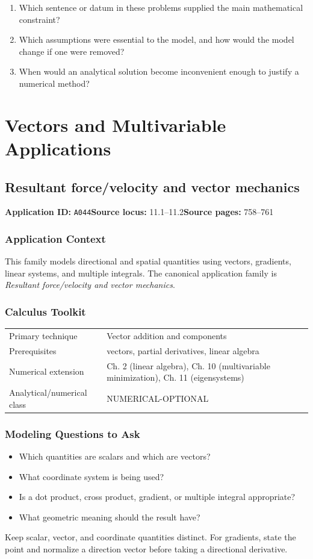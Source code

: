 \documentclass[11pt]{book}
\newcommand{\pid}[1]{\texttt{#1}}
\begin{document}
\begin{reflectionbox}\begin{enumerate}
\item Which sentence or datum in these problems supplied the main mathematical constraint?
\item Which assumptions were essential to the model, and how would the model change if one were removed?
\item When would an analytical solution become inconvenient enough to justify a numerical method?
\end{enumerate}\end{reflectionbox}
\part{Vectors and Multivariable Applications}
\chapter{Resultant force/velocity and vector mechanics}\label{app:A044}
\textbf{Application ID:} \pid{A044}\quad \textbf{Source locus:} 11.1–11.2\quad \textbf{Source pages:} 758–761
\section*{Application Context}
This family models directional and spatial quantities using vectors, gradients, linear systems, and multiple integrals. The canonical application family is \emph{Resultant force/velocity and vector mechanics}.
\section*{Calculus Toolkit}
\begin{tabularx}{\textwidth}{@{}lX@{}}\toprule
Primary technique & Vector addition and components \\
Prerequisites & vectors, partial derivatives, linear algebra \\
Numerical extension & Ch. 2 (linear algebra), Ch. 10 (multivariable minimization), Ch. 11 (eigensystems) \\
Analytical/numerical class & NUMERICAL-OPTIONAL \\
\bottomrule\end{tabularx}
\section*{Modeling Questions to Ask}\begin{itemize}
\item Which quantities are scalars and which are vectors?
\item What coordinate system is being used?
\item Is a dot product, cross product, gradient, or multiple integral appropriate?
\item What geometric meaning should the result have?
\end{itemize}
\begin{errorbox}Keep scalar, vector, and coordinate quantities distinct. For gradients, state the point and normalize a direction vector before taking a directional derivative.\end{errorbox}
\end{document}
